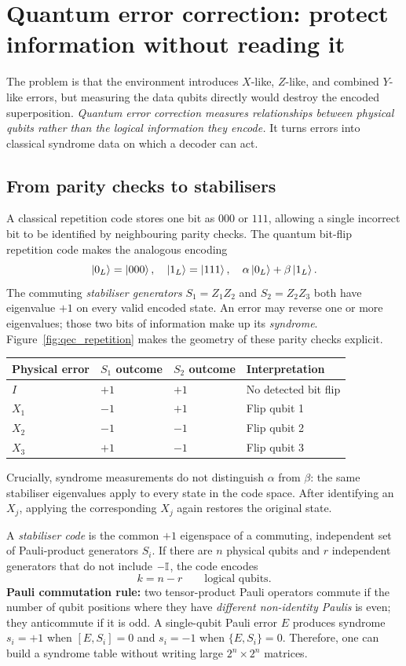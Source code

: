 \section{Quantum error correction: protect information without reading it}\label{sec:qec}
The problem is that the environment introduces $X$-like, $Z$-like, and combined $Y$-like errors, but measuring the data qubits directly would destroy the encoded superposition. \emph{Quantum error correction measures relationships between physical qubits rather than the logical information they encode.} It turns errors into classical syndrome data on which a decoder can act.

\subsection{From parity checks to stabilisers}
A classical repetition code stores one bit as $000$ or $111$, allowing a single incorrect bit to be identified by neighbouring parity checks. The quantum bit-flip repetition code makes the analogous encoding
\begin{equation}\label{eq:bitflipcode}
\left\lvert 0_L\right\rangle=\left\lvert 000\right\rangle,\quad\left\lvert 1_L\right\rangle=\left\lvert 111\right\rangle,\quad
\alpha\left\lvert 0_L\right\rangle+\beta\left\lvert 1_L\right\rangle.
\end{equation}
The commuting \emph{stabiliser generators} $S_1=Z_1Z_2$ and $S_2=Z_2Z_3$ both have eigenvalue $+1$ on every valid encoded state. An error may reverse one or more eigenvalues; those two bits of information make up its \emph{syndrome}. Figure~\ref{fig:qec_repetition} makes the geometry of these parity checks explicit.
\begin{center}
\small
\begin{tabular}{@{}llll@{}}\toprule
Physical error&$S_1$ outcome&$S_2$ outcome&Interpretation\\\midrule
$I$&$+1$&$+1$&No detected bit flip\\
$X_1$&$-1$&$+1$&Flip qubit 1\\
$X_2$&$-1$&$-1$&Flip qubit 2\\
$X_3$&$+1$&$-1$&Flip qubit 3\\\bottomrule
\end{tabular}
\end{center}
Crucially, syndrome measurements do not distinguish $\alpha$ from $\beta$: the same stabiliser eigenvalues apply to every state in the code space. After identifying an $X_j$, applying the corresponding $X_j$ again restores the original state.

A \emph{stabiliser code} is the common $+1$ eigenspace of a commuting, independent set of Pauli-product generators $S_i$. If there are $n$ physical qubits and $r$ independent generators that do not include $-\mathbb{I}$, the code encodes
\begin{equation}\label{eq:encodedqubits}
k=n-r\qquad\text{logical qubits.}
\end{equation}
\textbf{Pauli commutation rule:} two tensor-product Pauli operators commute if the number of qubit positions where they have \emph{different non-identity Paulis} is even; they anticommute if it is odd. A single-qubit Pauli error $E$ produces syndrome $s_i=+1$ when $[E,S_i]=0$ and $s_i=-1$ when $\{E,S_i\}=0$. Therefore, one can build a syndrome table without writing large $2^n\times2^n$ matrices.

